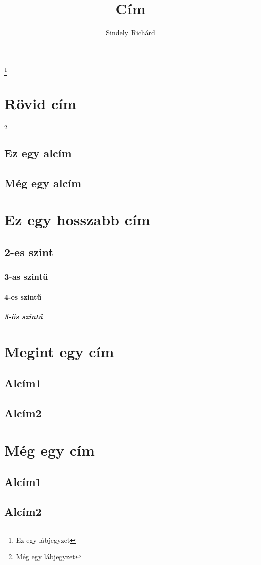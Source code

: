 \documentclass[twocolumn]{book}
\newenvironment{abstract}{}{}
\begin{document}
\title{Cím}
\author{Sindely Richárd}
\maketitle
\let\cleardoublepage\clearpage
\renewcommand{\thefootnote}{\fnsymbol{footnote}}
\begin{abstract}
\hulipsum[2]
\footnote{Ez egy lábjegyzet}
\end{abstract}
\setcounter{tocdepth}{5}
\tableofcontents
\clearpage
{}
\section{Rövid cím}
\setcounter{secnumdepth}{5}
\hulipsum[2]
\footnote{Még egy lábjegyzet}
\clearpage
\subsection{Ez egy alcím}
\hulipsum[3]
\clearpage
\subsection{Még egy alcím}
\hulipsum[3]
\section{Ez egy hosszabb cím}
\hulipsum[3]
\subsection{2-es szint}
\subsubsection{3-as szintű}
\paragraph{4-es szintű}
\subparagraph{5-ös szintű}
\appendix
\section{Megint egy cím}
\subsection{Alcím1}
\subsection{Alcím2}
\section{Még egy cím}
\subsection{Alcím1}
\subsection{Alcím2}
\end{document}
